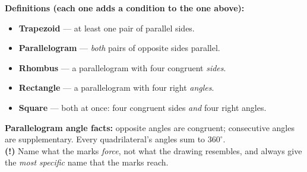 \documentclass[12pt]{article}
\begin{document}


\begin{formulabox}
\textbf{Definitions (each one adds a condition to the one above):}
\begin{itemize}[leftmargin=0.9cm, itemsep=0pt, topsep=2pt]
  \item \textbf{Trapezoid} --- at least one pair of parallel sides.
  \item \textbf{Parallelogram} --- \emph{both} pairs of opposite sides parallel.
  \item \textbf{Rhombus} --- a parallelogram with four congruent \emph{sides}.
  \item \textbf{Rectangle} --- a parallelogram with four right \emph{angles}.
  \item \textbf{Square} --- both at once: four congruent sides \emph{and} four
  right angles.
\end{itemize}
\textbf{Parallelogram angle facts:} opposite angles are congruent; consecutive
angles are supplementary. Every quadrilateral's angles sum to $360^\circ$.\\[2pt]
\textbf{(!)} Name what the marks \emph{force}, not what the drawing resembles,
and always give the \emph{most specific} name that the marks reach.
\end{formulabox}
\end{document}
